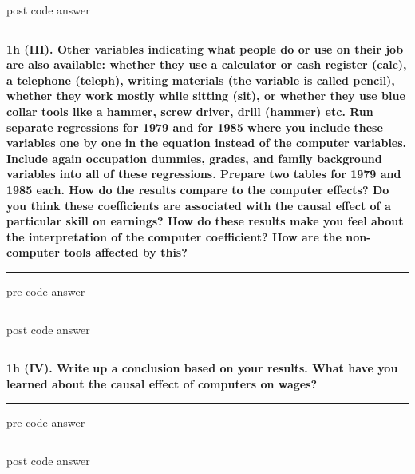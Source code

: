 \documentclass[12pt]{article}
\newcommand\question[1]{\vspace{1em}\hrule\vspace{1em}\textbf{#1}\vspace{1em}\hrule\vspace{1em}}
\begin{document}
post code answer

\newpage
\question{1h (III). Other variables indicating what people do or use on their job are also available: whether they use a calculator or cash register (calc), a telephone (teleph), writing materials (the variable is called pencil), whether they work mostly while sitting (sit), or whether they use blue collar tools like a hammer, screw driver, drill (hammer) etc. Run separate regressions for 1979 and for 1985 where you include these variables one by one in the equation instead of the computer variables. Include again occupation dummies, grades, and family background variables into all of these regressions. Prepare two tables for 1979 and 1985 each. How do the results compare to the computer effects? Do you think these coefficients are associated with the causal effect of a particular skill on earnings? How do these results make you feel about the interpretation of the computer coefficient? How are the non-computer tools affected by this?}
pre code answer

\begin{lstlisting}
\end{lstlisting}

post code answer

\newpage
\question{1h (IV). Write up a conclusion based on your results. What have you learned about the causal effect of computers on wages?}
pre code answer

\begin{lstlisting}
\end{lstlisting}

post code answer



\end{document}
